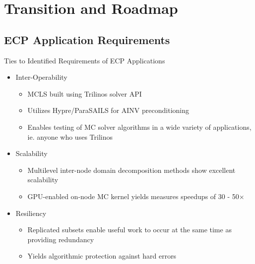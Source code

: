 \documentclass{beamer}
\begin{document}
\section{Transition and Roadmap}
\subsection{ECP Application Requirements}

\begin{frame}{Ties to Identified Requirements of ECP Applications}

  \begin{itemize}

  \item Inter-Operability
    \begin{itemize}
    \item MCLS built using Trilinos solver API
    \item Utilizes Hypre/ParaSAILS for AINV preconditioning
    \item Enables testing of MC solver algorithms in a wide variety of
      applications, ie. anyone who uses Trilinos
    \end{itemize}

  \item Scalability
    \begin{itemize}
    \item Multilevel inter-node domain decomposition methods show excellent
      scalability
    \item GPU-enabled on-node MC kernel yields measures speedups of 30 -
      50$\times$
    \end{itemize}

  \item Resiliency
    \begin{itemize}
    \item Replicated subsets enable useful work to occur at the same time as
      providing redundancy
    \item Yields algorithmic protection against hard errors
    \end{itemize}
  \end{itemize}

\end{frame}

\end{document}
